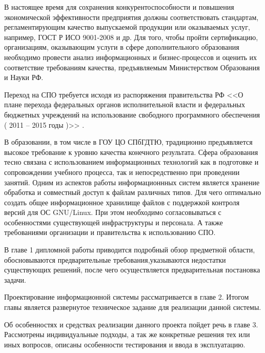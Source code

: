 \documentclass[utf8,usehyperref,12pt]{G7-32}
\begin{document}
\pagestyle{empty}
\frontmatter %

\setcounter{page}{6}%

\tableofcontents{}


\Introduction
\pagestyle{plain}
В настоящее время для сохранения конкурентоспособности и повышения экономической эффективности предприятия должны соответствовать стандартам, регламентирующим качество выпускаемой продукции или оказываемых услуг, например, ГОСТ Р ИСО 9001-2008 и др. Для того, чтобы пройти сертификацию, организациям, оказывающим услуги в сфере дополнительного образования необходимо провести анализ информационных и бизнес-процессов и оценить их соответствие требованиям качества, предъявляемым Министерством Образования и Науки РФ.

Переход на СПО требуется исходя из распоряжения правительства РФ <<О плане перехода федеральных органов исполнительной власти и федеральных бюджетных учреждений на использование свободного программного обеспечения ( 2011 -- 2015 годы )>> \cite{foss_migrate}.

В образовании, в том числе в ГОУ ЦО СПбГДТЮ, традиционно предъявляется высокое требование к уровню качества конечного результата. Сфера образования тесно связана с  использованием информационных технологий как в подготовке и сопровождении учебного процесса, так и непосредственно при проведении занятий. Одним из аспектов работы информационнных систем является хранение обработка и совместный доступ к файлам различных типов. Для чего оптимально создать общее информационное хранилище файлов с поддержкой контроля версий для ОС GNU/Linux. При этом необходимо согласовываться с особенностями существующей инфраструктуры и персонала. А также требованиями организации и правительства к использованию СПО.

В главе 1 дипломной работы приводится подробный обзор предметной области, обосновываются предварительные требования,указываются недостатки существующих решений, после чего осуществляется предварительная постановка задачи.

Проектирование информационной системы рассматривается в главе 2. Итогом главы является развернутое техническое задание для реализации данной системы.

Об особенностях и средствах реализации данного проекта пойдет речь в главе 3.  Рассмотрены индивидуальные подходы, а так же конкретные решения тех или иных вопросов, описаны особенности тестирования и ввода в эксплуатацию.
\end{document}
